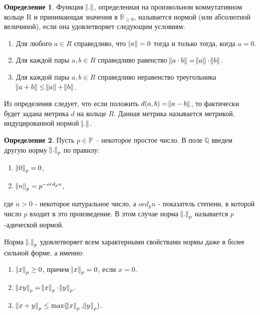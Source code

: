 \documentclass[master, och, diploma, times]{sty/SCWorks}
\theoremstyle{plain}
\theoremstyle{definition}
\newtheorem{defn}{Определение}[section]
\numberwithin{equation}{section}
\begin{document}
\begin{defn}
Функция $\norm{.}$, определенная на произвольном коммутативном кольце R и принимающая значения в $\mathbb {R}_{\ge 0}$, называется нормой (или абсолютной величиной), если она удовлетворяет следующим условиям:

\begin{enumerate} 
	\item Для любого $a \in R$ справедливо, что $\norm{a}=0$ тогда и только тогда, когда $a=0$.
	\item Для каждой пары $a, b \in R$ справедливо равенство $\norm{a \cdot b} = \norm{a} \cdot \norm{b}$.
	\item Для каждой пары $a, b \in R$ справедливо неравенство треугольника $\norm{a + b} \le \norm{a} + \norm{b}$.
\end{enumerate}
\end{defn}

Из определения следует, что если положить $d(a, b)= \norm{a - b}$, то фактически будет задана метрика $d$ на кольце $R$. Данная метрика называется метрикой, индуцированной нормой $\norm{.}$.

\begin{defn}
Пусть $p \in \mathbb {P}$ -- некоторое простое число. В поле $\mathbb {Q}$ введем другую норму $\norm{.}_p$ по правилу:

\begin{enumerate} 
	\item $\norm{0}_p = 0$,
	\item $\norm{n}_p = p ^ {-ord_pn}$,
\end{enumerate}

\noindent где $n > 0$ - некоторое натуральное число, а $ord_pn$ - показатель степени, в которой число $p$ входит в это произведение. В этом случае норма $\norm{.}_p$ называется \mbox{$p$-адической} нормой.
\end{defn}

Норма $\norm{.}_p$  удовлетворяет всем характерными свойствами нормы даже в более сильной форме, а именно:

\begin{enumerate} 
	\item $\norm{x}_p \ge 0$, причем $\norm{x}_p = 0$, если $x = 0$.
	\item $\norm{xy}_p = \norm{x}_p \cdot \norm{y}_p$.
	\item $\norm{x + y}_p \le \max(\norm{x}_p, \norm{y}_p)$\cite{bib:analysis:volovich}.
\end{enumerate}
\end{document}
